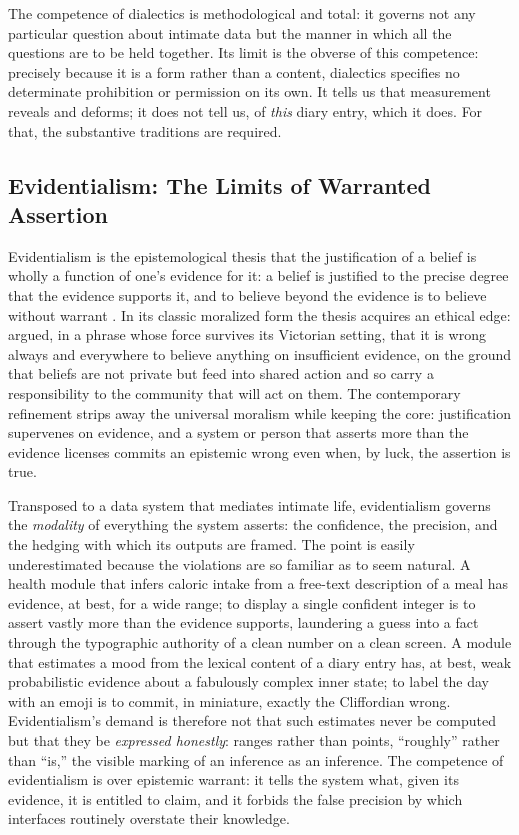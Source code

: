 The competence of dialectics is methodological and total: it governs not any particular question about intimate data but the manner in which all the questions are to be held together. Its limit is the obverse of this competence: precisely because it is a form rather than a content, dialectics specifies no determinate prohibition or permission on its own. It tells us that measurement reveals and deforms; it does not tell us, of \emph{this} diary entry, which it does. For that, the substantive traditions are required.

\subsection{Evidentialism: The Limits of Warranted Assertion}\label{p01:sec:evidentialism}

Evidentialism is the epistemological thesis that the justification of a belief is wholly a function of one's evidence for it: a belief is justified to the precise degree that the evidence supports it, and to believe beyond the evidence is to believe without warrant \parencite{feldman1985evidentialism}. In its classic moralized form the thesis acquires an ethical edge: \textcite{clifford1877ethics} argued, in a phrase whose force survives its Victorian setting, that it is wrong always and everywhere to believe anything on insufficient evidence, on the ground that beliefs are not private but feed into shared action and so carry a responsibility to the community that will act on them. The contemporary refinement strips away the universal moralism while keeping the core: justification supervenes on evidence, and a system or person that asserts more than the evidence licenses commits an epistemic wrong even when, by luck, the assertion is true.

Transposed to a data system that mediates intimate life, evidentialism governs the \emph{modality} of everything the system asserts: the confidence, the precision, and the hedging with which its outputs are framed. The point is easily underestimated because the violations are so familiar as to seem natural. A health module that infers caloric intake from a free-text description of a meal has evidence, at best, for a wide range; to display a single confident integer is to assert vastly more than the evidence supports, laundering a guess into a fact through the typographic authority of a clean number on a clean screen. A module that estimates a mood from the lexical content of a diary entry has, at best, weak probabilistic evidence about a fabulously complex inner state; to label the day with an emoji is to commit, in miniature, exactly the Cliffordian wrong. Evidentialism's demand is therefore not that such estimates never be computed but that they be \emph{expressed honestly}: ranges rather than points, ``roughly'' rather than ``is,'' the visible marking of an inference as an inference. The competence of evidentialism is over epistemic warrant: it tells the system what, given its evidence, it is entitled to claim, and it forbids the false precision by which interfaces routinely overstate their knowledge.

